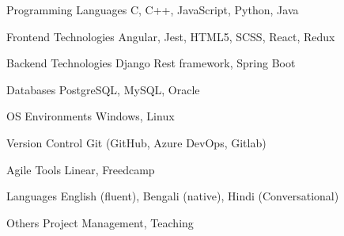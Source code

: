 

\begin{cvskills}

  \cvskill
    {Programming Languages} %
    {C, C++, JavaScript, Python, Java} %

  \cvskill
    {Frontend Technologies} %
    {Angular, Jest, HTML5, SCSS, React, Redux} %

  \cvskill
    {Backend Technologies} %
    {Django Rest framework, Spring Boot} %

  \cvskill
    {Databases} %
    {PostgreSQL, MySQL, Oracle} %

  \cvskill
    {OS Environments} %
    {Windows, Linux} %

  \cvskill
    {Version Control} %
    {Git (GitHub, Azure DevOps, Gitlab)} %

  \cvskill
    {Agile Tools} %
    {Linear, Freedcamp} %

  \cvskill
    {Languages} %
    {English (fluent), Bengali (native), Hindi (Conversational)} %

  \cvskill
    {Others} %
    {Project Management, Teaching} %

\end{cvskills}
